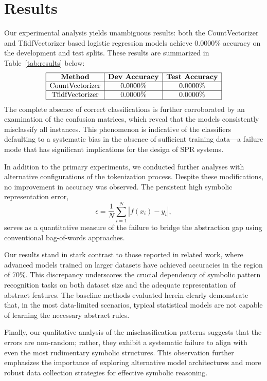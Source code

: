 \documentclass{article}
\begin{document}
\section{Results}
Our experimental analysis yields unambiguous results: both the CountVectorizer and TfidfVectorizer based logistic regression models achieve 0.0000\% accuracy on the development and test splits. These results are summarized in Table~\ref{tab:results} below:
\[
\begin{array}{|c|c|c|}
\hline
\textbf{Method} & \textbf{Dev Accuracy} & \textbf{Test Accuracy} \\
\hline
\text{CountVectorizer} & 0.0000\% & 0.0000\% \\
\hline
\text{TfidfVectorizer} & 0.0000\% & 0.0000\% \\
\hline
\end{array}
\]
The complete absence of correct classifications is further corroborated by an examination of the confusion matrices, which reveal that the models consistently misclassify all instances. This phenomenon is indicative of the classifiers defaulting to a systematic bias in the absence of sufficient training data—a failure mode that has significant implications for the design of SPR systems.

In addition to the primary experiments, we conducted further analyses with alternative configurations of the tokenization process. Despite these modifications, no improvement in accuracy was observed. The persistent high symbolic representation error,
\[
\epsilon = \frac{1}{N}\sum_{i=1}^{N} \left| f(x_i) - y_i \right|,
\]
serves as a quantitative measure of the failure to bridge the abstraction gap using conventional bag-of-words approaches.

Our results stand in stark contrast to those reported in related work, where advanced models trained on larger datasets have achieved accuracies in the region of 70\%. This discrepancy underscores the crucial dependency of symbolic pattern recognition tasks on both dataset size and the adequate representation of abstract features. The baseline methods evaluated herein clearly demonstrate that, in the most data-limited scenarios, typical statistical models are not capable of learning the necessary abstract rules.

Finally, our qualitative analysis of the misclassification patterns suggests that the errors are non-random; rather, they exhibit a systematic failure to align with even the most rudimentary symbolic structures. This observation further emphasizes the importance of exploring alternative model architectures and more robust data collection strategies for effective symbolic reasoning.
\end{document}
